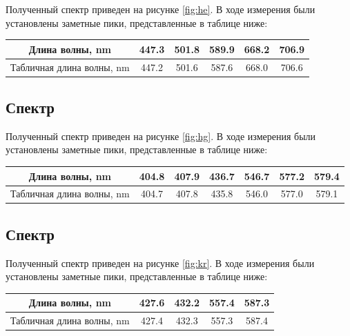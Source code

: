 \documentclass[a4paper, 12pt]{article}
\begin{document}
Полученный спектр приведен на рисунке \ref{fig:he}. В ходе измерения были установлены заметные пики, представленные в таблице ниже:

\begin{center}
	\begin{tabular}{|c|c|c|c|c|c|}
		\hline
		Длина волны, nm & 447.3 & 501.8 & 589.9 & 668.2 & 706.9 \\
		\hline
		Табличная длина волны, nm & 447.2 & 501.6 & 587.6 & 668.0 & 706.6 \\
		\hline
	\end{tabular}
\end{center}






\subsection{Спектр }

Полученный спектр приведен на рисунке \ref{fig:hg}. В ходе измерения были установлены заметные пики, представленные в таблице ниже:

\begin{center}
	\begin{tabular}{|c|c|c|c|c|c|c|}
		\hline
		Длина волны, nm & 404.8 & 407.9 & 436.7 & 546.7 & 577.2 & 579.4 \\
		\hline
		Табличная длина волны, nm & 404.7 & 407.8 & 435.8 & 546.0 & 577.0 & 579.1 \\
		\hline
	\end{tabular}
\end{center}






\subsection{Спектр }

Полученный спектр приведен на рисунке \ref{fig:kr}. В ходе измерения были установлены заметные пики, представленные в таблице ниже:

\begin{center}
	\begin{tabular}{|c|c|c|c|c|}
		\hline
		Длина волны, nm & 427.6 & 432.2 & 557.4 & 587.3 \\
		\hline
		Табличная длина волны, nm & 427.4 & 432.3 & 557.3 & 587.4 \\
		\hline
	\end{tabular}
\end{center}
\end{document}

